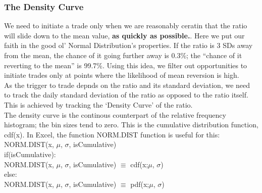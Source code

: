 \documentclass{article}
\begin{document}
\subsubsection{The Density Curve}
We need to initiate a trade only when we are reasonably ceratin that the
ratio will slide down to the mean value, \textbf{as quickly as possible.}. Here
we put our faith in the good ol' Normal Distribution's properties. If the ratio
is 3 SDs away from the mean, the chance of it going further away is 0.3\%; the ``chance of it reverting to the mean'' is 99.7\%. Using this idea, we filter
out opportunities to initiate trades only at points where the likelihood of mean
reversion is high.\\
As the trigger to trade depnds on the ratio and its standard deviation, we need to track the daily standard deviation of the ratio as opposed to the ratio itself.
This is achieved by tracking the `Density Curve' of the ratio.\\
The density curve is the continous counterpart of the relative frequency
histogram; the bin sizes tend to zero. This is the cumulative distribution function, cdf(x). In Excel, the function NORM.DIST function is useful for this:\\
NORM.DIST(x, $\mu$, $\sigma$, isCumulative)\\
if(isCumulative):\\
\indent NORM.DIST(x, $\mu$, $\sigma$, isCumulative) $\equiv$ cdf(x;$\mu$, $\sigma$)\\
else:\\
\indent NORM.DIST(x, $\mu$, $\sigma$, isCumulative) $\equiv$ pdf(x;$\mu$, $\sigma$)
\end{document}
